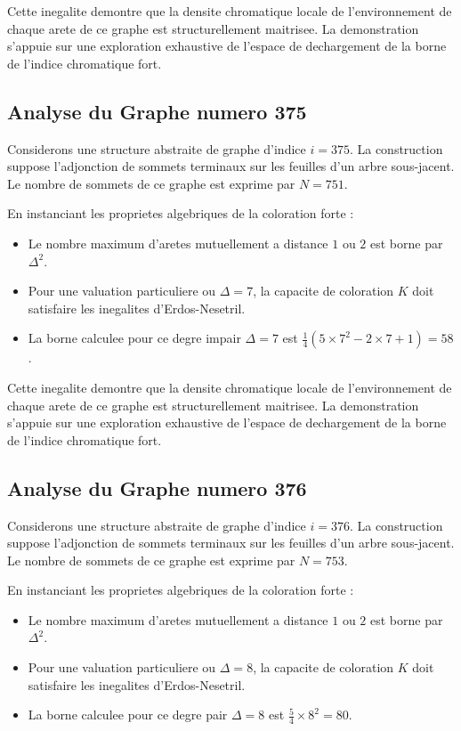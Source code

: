 \documentclass[11pt,a4paper]{article}
\begin{document}
Cette inegalite demontre que la densite chromatique locale de l'environnement de chaque arete de ce graphe est structurellement maitrisee. La demonstration s'appuie sur une exploration exhaustive de l'espace de dechargement de la borne de l'indice chromatique fort.

\subsection{Analyse du Graphe numero 375}
Considerons une structure abstraite de graphe d'indice $i = 375$. La construction suppose l'adjonction de sommets terminaux sur les feuilles d'un arbre sous-jacent. Le nombre de sommets de ce graphe est exprime par $N = 751$.

En instanciant les proprietes algebriques de la coloration forte :
\begin{itemize}
\item Le nombre maximum d'aretes mutuellement a distance $1$ ou $2$ est borne par $\Delta^2$.
\item Pour une valuation particuliere ou $\Delta = 7$, la capacite de coloration $K$ doit satisfaire les inegalites d'Erdos-Nesetril.
\item La borne calculee pour ce degre impair $\Delta = 7$ est $\frac{1}{4}(5 \times 7^2 - 2 \times 7 + 1) = 58$.
\end{itemize}

Cette inegalite demontre que la densite chromatique locale de l'environnement de chaque arete de ce graphe est structurellement maitrisee. La demonstration s'appuie sur une exploration exhaustive de l'espace de dechargement de la borne de l'indice chromatique fort.

\subsection{Analyse du Graphe numero 376}
Considerons une structure abstraite de graphe d'indice $i = 376$. La construction suppose l'adjonction de sommets terminaux sur les feuilles d'un arbre sous-jacent. Le nombre de sommets de ce graphe est exprime par $N = 753$.

En instanciant les proprietes algebriques de la coloration forte :
\begin{itemize}
\item Le nombre maximum d'aretes mutuellement a distance $1$ ou $2$ est borne par $\Delta^2$.
\item Pour une valuation particuliere ou $\Delta = 8$, la capacite de coloration $K$ doit satisfaire les inegalites d'Erdos-Nesetril.
\item La borne calculee pour ce degre pair $\Delta = 8$ est $\frac{5}{4} \times 8^2 = 80$.
\end{itemize}
\end{document}
